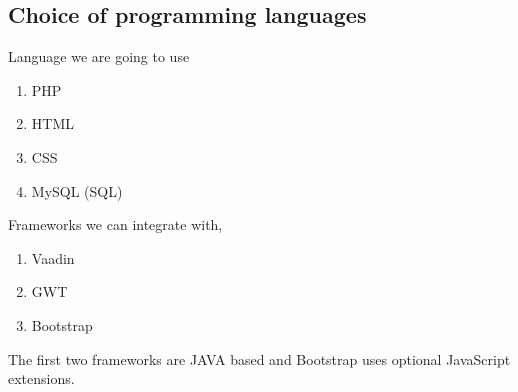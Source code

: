 \documentclass[11pt]{article}
\begin{document}
\subsection{Choice of programming languages}
Language we are going to use
\begin{enumerate}[nosep, label=\textendash]
 \item PHP
 \item HTML
 \item CSS
 \item MySQL (SQL)
\end{enumerate}
Frameworks we can integrate with,
\begin{enumerate}[nosep, label=\textendash]
\item Vaadin
\item GWT
\item Bootstrap
\end{enumerate}
The first two frameworks are JAVA based and Bootstrap uses optional JavaScript extensions.
\end{document}
